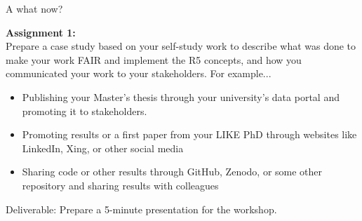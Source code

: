 
\begin{frame}{A what now?}

    \textbf{Assignment 1:}\\
    Prepare a case study based on your self-study work to describe what was done to make your work FAIR and implement the R5 concepts, and how you communicated your work to your stakeholders. For example...
    \begin{itemize}
        \item Publishing your Master’s thesis through your university’s data portal and promoting it to stakeholders.
        \item Promoting results or a first paper from your LIKE PhD through websites like LinkedIn, Xing, or other social media
        \item Sharing code or other results through GitHub, Zenodo, or some other repository and sharing results with colleagues
    \end{itemize}
    
    Deliverable: Prepare a 5-minute presentation for the workshop.


\end{frame}

